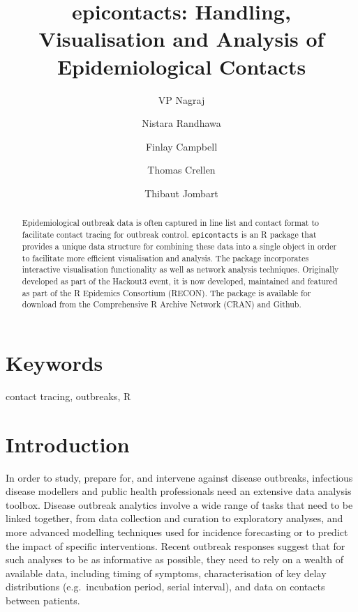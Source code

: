 \documentclass[9pt,a4paper,]{extarticle}
\theoremstyle{definition}
\theoremstyle{definition}
\theoremstyle{definition}
\theoremstyle{remark}
\begin{document}
\pagestyle{front}

\title{epicontacts: Handling, Visualisation and Analysis of Epidemiological Contacts}

\author[1]{VP Nagraj}
\author[2]{Nistara Randhawa}
\author[3]{Finlay Campbell}
\author[4]{Thomas Crellen}
\author[3]{Thibaut Jombart}

\maketitle
\thispagestyle{front}

\begin{abstract}
Epidemiological outbreak data is often captured in line list and contact format to facilitate contact tracing for outbreak control. \texttt{epicontacts} is an R package that provides a unique data structure for combining these data into a single object in order to facilitate more efficient visualisation and analysis. The package incorporates interactive visualisation functionality as well as network analysis techniques. Originally developed as part of the Hackout3 event, it is now developed, maintained and featured as part of the R Epidemics Consortium (RECON). The package is available for download from the Comprehensive R Archive Network (CRAN) and Github.
\end{abstract}

\section*{Keywords}
contact tracing, outbreaks, R


\clearpage
\pagestyle{main}

\section{Introduction}\label{introduction}

In order to study, prepare for, and intervene against disease outbreaks, infectious disease modellers and public health professionals need an extensive data analysis toolbox. Disease outbreak analytics involve a wide range of tasks that need to be linked together, from data collection and curation to exploratory analyses, and more advanced modelling techniques used for incidence forecasting\citep{funk:2016}\citep{nouvellet:2017} or to predict the impact of specific interventions\citep{nouvellet:2015}\citep{parker:2015}. Recent outbreak responses suggest that for such analyses to be as informative as possible, they need to rely on a wealth of available data, including timing of symptoms, characterisation of key delay distributions (e.g.~incubation period, serial interval), and data on contacts between patients\citep{cauchemez:2014}\citep{aylward:2014}\citep{agua-agum:2015}\citep{cori:2017}.
\end{document}
